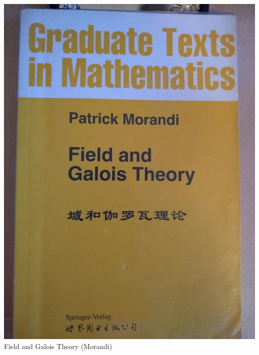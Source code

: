 \documentclass[t]{beamer}
\newcommand{\htarget}[2]{\hypertarget{#1}{#2}}
\begin{document}
\begin{frame}\htarget{GT}{} \begin{center}
\includegraphics[height=0.8\textheight]{Field_and_Galois_Theory_mini.jpg} \\
Field and Galois Theory (Morandi) 
\end{center} \end{frame}
\end{document}
